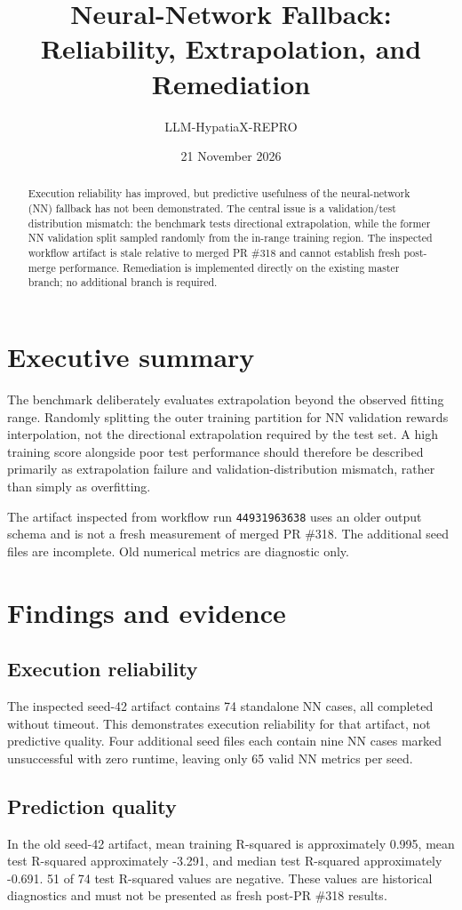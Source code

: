 \documentclass[11pt,a4paper]{article}
\title{Neural-Network Fallback: Reliability, Extrapolation, and Remediation}
\author{LLM-HypatiaX-REPRO}
\date{21 November 2026}
\begin{document}
\maketitle

\begin{abstract}
Execution reliability has improved, but predictive usefulness of the neural-network (NN) fallback has not been demonstrated. The central issue is a validation/test distribution mismatch: the benchmark tests directional extrapolation, while the former NN validation split sampled randomly from the in-range training region. The inspected workflow artifact is stale relative to merged PR \#318 and cannot establish fresh post-merge performance. Remediation is implemented directly on the existing master branch; no additional branch is required.
\end{abstract}

\section{Executive summary}
The benchmark deliberately evaluates extrapolation beyond the observed fitting range. Randomly splitting the outer training partition for NN validation rewards interpolation, not the directional extrapolation required by the test set. A high training score alongside poor test performance should therefore be described primarily as extrapolation failure and validation-distribution mismatch, rather than simply as overfitting.

The artifact inspected from workflow run \texttt{44931963638} uses an older output schema and is not a fresh measurement of merged PR \#318. The additional seed files are incomplete. Old numerical metrics are diagnostic only.

\section{Findings and evidence}
\subsection{Execution reliability}
The inspected seed-42 artifact contains 74 standalone NN cases, all completed without timeout. This demonstrates execution reliability for that artifact, not predictive quality. Four additional seed files each contain nine NN cases marked unsuccessful with zero runtime, leaving only 65 valid NN metrics per seed.

\subsection{Prediction quality}
In the old seed-42 artifact, mean training R-squared is approximately 0.995, mean test R-squared approximately -3.291, and median test R-squared approximately -0.691. 51 of 74 test R-squared values are negative. These values are historical diagnostics and must not be presented as fresh post-PR \#318 results.
\end{document}
